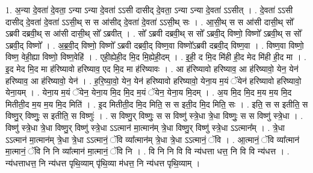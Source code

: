 \documentclass[17pt]{extarticle}
\begin{document}
1. अ॒न्या दे॒वता॑ दे॒वता॒ ऽन्या ऽन्या दे॒वता॑ ऽऽसी दासीद् दे॒वता॒ ऽन्या ऽन्या दे॒वता॑ ऽऽसीत् । . दे॒वता॑ ऽऽसी दासीद् दे॒वता॑ दे॒वता॑ ऽऽसी॒थ् स स आ॑सीद् दे॒वता॑ दे॒वता॑ ऽऽसी॒थ् सः । . आ॒सी॒थ् स स आ॑सी दासी॒थ् सो᳚ ऽब्रवी दब्रवी॒थ् स आ॑सी दासी॒थ् सो᳚ ऽब्रवीत् । . सो᳚ ऽब्रवी दब्रवी॒थ् स सो᳚ ऽब्रवी॒द् विष्णो॒ विष्णो᳚ ऽब्रवी॒थ् स सो᳚ ऽब्रवी॒द् विष्णो᳚ । . अ॒ब्र॒वी॒द् विष्णो॒ विष्णो᳚ ऽब्रवी दब्रवी॒द् विष्ण॒वा विष्णो᳚ऽब्रवी दब्रवी॒द् विष्ण॒वा । . विष्ण॒वा विष्णो॒ विष्ण॒ वेही॒ह्या विष्णो॒ विष्ण॒वेहि॑ । . एही॒ह्येही॒द मि॒द मि॒ह्येही॒दम् । . इ॒ही॒ द मि॒द मि॑ही ही॒द मेद मि॑ही ही॒द मा । . इ॒द मेद मि॒द मा ह॑रिष्यावो हरिष्याव॒ एद मि॒द मा ह॑रिष्यावः । . आ ह॑रिष्यावो हरिष्याव॒ आ ह॑रिष्यावो॒ येन॒ येन॑ हरिष्याव॒ आ ह॑रिष्यावो॒ येन॑ । . ह॒रि॒ष्या॒वो॒ येन॒ येन॑ हरिष्यावो हरिष्यावो॒ येना॒य म॒यं ॅयेन॑ हरिष्यावो हरिष्यावो॒ येना॒यम् । . येना॒य म॒यं ॅयेन॒ येना॒य मि॒द मि॒द म॒यं ॅयेन॒ येना॒य मि॒दम् । . अ॒य मि॒द मि॒द म॒य म॒य मि॒द मितीती॒द म॒य म॒य मि॒द मिति॑ । . इ॒द मितीती॒द मि॒द मिति॒ स स इती॒द मि॒द मिति॒ सः । . इति॒ स स इतीति॒ स विष्णु॒र् विष्णुः॒ स इतीति॒ स विष्णुः॑ । . स विष्णु॒र् विष्णुः॒ स स विष्णु॑ स्त्रे॒धा त्रे॒धा विष्णुः॒ स स विष्णु॑ स्त्रे॒धा । . विष्णु॑ स्त्रे॒धा त्रे॒धा विष्णु॒र् विष्णु॑ स्त्रे॒धा ऽऽत्मान॑ मा॒त्मान॑म् त्रे॒धा विष्णु॒र् विष्णु॑ स्त्रे॒धा ऽऽत्मान᳚म् । . त्रे॒धा ऽऽत्मान॑ मा॒त्मान॑म् त्रे॒धा त्रे॒धा ऽऽत्मानं॒ ॅवि व्या᳚त्मान॑म् त्रे॒धा त्रे॒धा ऽऽत्मानं॒ ॅवि । . आ॒त्मानं॒ ॅवि व्या᳚त्मान॑ मा॒त्मानं॒ ॅवि नि नि व्या᳚त्मान॑ मा॒त्मानं॒ ॅवि नि । . वि नि नि वि वि न्य॑धत्ता धत्त॒ नि वि वि न्य॑धत्त । . न्य॑धत्ताधत्त॒ नि न्य॑धत्त पृथि॒व्याम् पृ॑थि॒व्या म॑धत्त॒ नि न्य॑धत्त पृथि॒व्याम् । \newline
\end{document}
